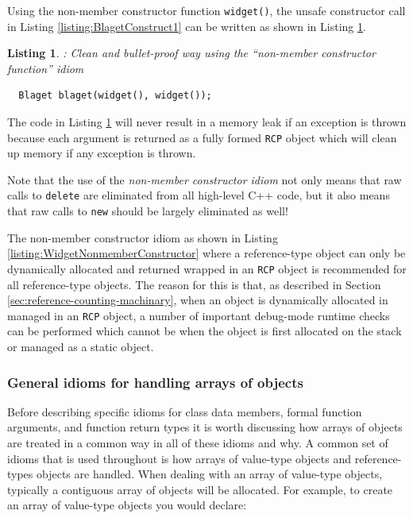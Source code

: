 \documentclass[pdf,ps2pdf,11pt]{SANDreport}
\newtheorem{listing}{Listing}
\begin{document}
Using the non-member constructor function {}\texttt{widget()}, the
unsafe constructor call in Listing {}\ref{listing:BlagetConstruct1} can
be written as shown in Listing {}\ref{listing:BlagetConstruct3}.

\begin{listing}: Clean and bullet-proof way using the ``non-member
constructor function'' idiom \\
\label{listing:BlagetConstruct3}
{\small\begin{verbatim}
  Blaget blaget(widget(), widget());
\end{verbatim}}
\end{listing}

The code in Listing {}\ref{listing:BlagetConstruct3} will never result
in a memory leak if an exception is thrown because each argument is
returned as a fully formed {}\texttt{RCP} object which will clean up
memory if any exception is thrown.

Note that the use of the {}\textit{non-member constructor idiom} not
only means that raw calls to {}\texttt{delete} are eliminated from all
high-level C++ code, but it also means that raw calls to
{}\texttt{new} should be largely eliminated as well!

The non-member constructor idiom as shown in Listing
{}\ref{listing:WidgetNonmemberConstructor} where a reference-type
object can only be dynamically allocated and returned wrapped in an
{}\texttt{RCP} object is recommended for all reference-type objects.
The reason for this is that, as described in Section
{}\ref{sec:reference-counting-machinary}, when an object is
dynamically allocated in managed in an {}\texttt{RCP} object, a number
of important debug-mode runtime checks can be performed which cannot
be when the object is first allocated on the stack or managed as a
static object.


%
{}\subsubsection{General idioms for handling arrays of objects}
%

Before describing specific idioms for class data members, formal
function arguments, and function return types it is worth discussing
how arrays of objects are treated in a common way in all of these
idioms and why.  A common set of idioms that is used throughout is how
arrays of value-type objects and reference-types objects are handled.
When dealing with an array of value-type objects, typically a
contiguous array of objects will be allocated.  For example, to create
an array of value-type objects you would declare:
\end{document}
